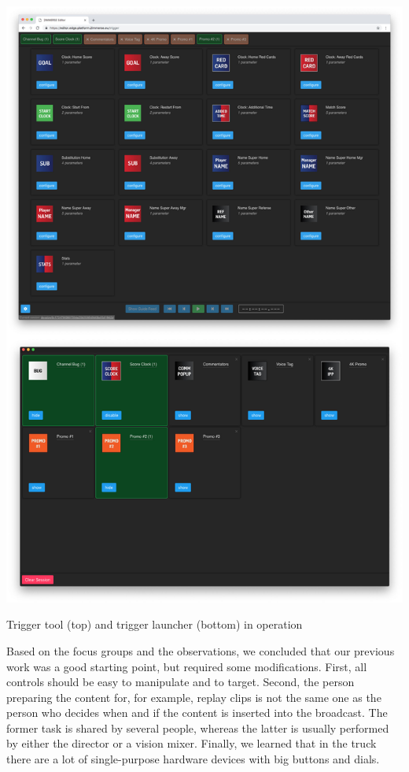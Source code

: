 \documentclass[sigchi-a, authorversion]{acmart}
\begin{document}
\begin{marginfigure}
    \includegraphics[width=\marginparwidth-10pt]{Figures/triggertool.jpg}
    \caption{Trigger tool (top) and trigger launcher (bottom) in operation}
    \label{fig:triggertool}
\end{marginfigure}

Based on the focus groups and the observations, we concluded that our previous work was a good starting point, but required some modifications. First, all controls should be easy to manipulate and to target. Second, the person preparing the content for, for example, replay clips is not the same one as the person who decides when and if the content is inserted into the broadcast. The former task is shared by several people, whereas the latter is usually performed by either the director or a vision mixer. Finally, we learned that in the truck there are a lot of single-purpose hardware devices with big buttons and dials.
\end{document}
